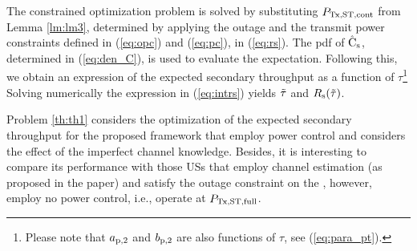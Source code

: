 \begin{IEEEproof}
The constrained optimization problem is solved by substituting $P_{\text{Tx,ST,cont}}$ from Lemma \ref{lm:lm3}, determined by applying the outage and the transmit power constraints defined in (\ref{eq:opc}) and (\ref{eq:pc}), in (\ref{eq:rs}). 
The pdf of $\hat{\text{{C}}}_{\text{s}}$, determined in (\ref{eq:den_C}), is used to evaluate the expectation. Following this, we obtain an expression of the expected secondary throughput as a function of $\tau$\footnote{Please note that $a_{\text{p,2}}$ and $b_{\text{p,2}}$ are also functions of $\tau$, see (\ref{eq:para_pt}).}
Solving numerically the expression in (\ref{eq:intrs}) yields $\tilde{\tau}$ and $R_{\text{s}}(\tilde{\tau})$. 
\end{IEEEproof}
\begin{coro} \label{cor:cor2}
\normalfont
Problem \ref{th:th1} considers the optimization of the expected secondary throughput for the proposed framework that employ power control and considers the effect of the imperfect channel knowledge.  Besides, it is interesting to compare its performance with those USs that employ channel estimation (as proposed in the paper) and satisfy the outage constraint on the , however, employ no power control, i.e., operate at $P_{\text{Tx,ST,full}}$.  
\end{coro}


